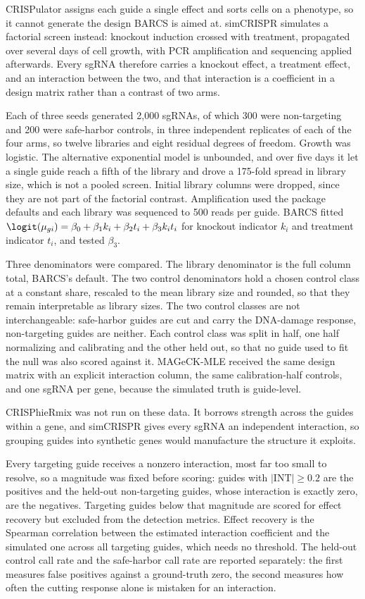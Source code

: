 CRISPulator assigns each guide a single effect and sorts cells on a
phenotype, so it cannot generate the design BARCS is aimed at.  simCRISPR
\citep{zhu2026simcrispr} simulates a factorial screen instead: knockout
induction crossed with treatment, propagated over several days of cell
growth, with PCR amplification and sequencing applied afterwards.  Every
sgRNA therefore carries a knockout effect, a treatment effect, and an
interaction between the two, and that interaction is a coefficient in a
design matrix rather than a contrast of two arms.

Each of three seeds generated 2,000 sgRNAs, of which 300 were non-targeting
and 200 were safe-harbor controls, in three independent replicates of each of
the four arms, so twelve libraries and eight residual degrees of freedom.
Growth was logistic.  The alternative exponential model is unbounded, and over
five days it let a single guide reach a fifth of the library and drove a
175-fold spread in library size, which is not a pooled screen.  Initial
library columns were dropped, since they are not part of the factorial
contrast.  Amplification used the package defaults and each library was
sequenced to 500 reads per guide.  BARCS fitted
$\logit(\mu_{gi})=\beta_0+\beta_1 k_i+\beta_2 t_i+\beta_3 k_i t_i$
for knockout indicator $k_i$ and treatment indicator $t_i$, and tested
$\beta_3$.

Three denominators were compared.  The library denominator is the full column
total, BARCS's default.  The two control denominators hold a chosen control
class at a constant share, rescaled to the mean library size and rounded, so
that they remain interpretable as library sizes.  The two control classes are
not interchangeable: safe-harbor guides are cut and carry the DNA-damage
response, non-targeting guides are neither.  Each control class was split in
half, one half normalizing and calibrating and the other held out, so that no
guide used to fit the null was also scored against it.  MAGeCK-MLE received
the same design matrix with an explicit interaction column, the same
calibration-half controls, and one sgRNA per gene, because the simulated truth
is guide-level.

CRISPhieRmix was not run on these data.  It borrows strength across the guides
within a gene, and simCRISPR gives every sgRNA an independent interaction, so
grouping guides into synthetic genes would manufacture the structure it
exploits.

Every targeting guide receives a nonzero interaction, most far too small to
resolve, so a magnitude was fixed before scoring: guides with
$\lvert\mathrm{INT}\rvert\geq0.2$ are the positives and the held-out
non-targeting guides, whose interaction is exactly zero, are the negatives.
Targeting guides below that magnitude are scored for effect recovery but
excluded from the detection metrics.  Effect recovery is the Spearman
correlation between the estimated interaction coefficient and the simulated
one across all targeting guides, which needs no threshold.  The held-out
control call rate and the safe-harbor call rate are reported separately: the
first measures false positives against a ground-truth zero, the second
measures how often the cutting response alone is mistaken for an interaction.

